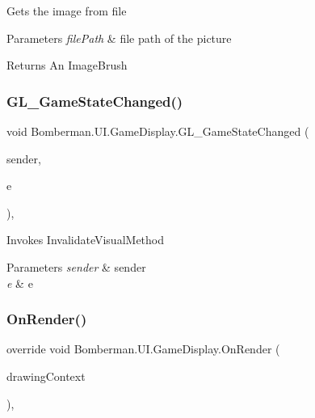 Gets the image from file 


\begin{DoxyParams}{Parameters}
{\em file\+Path} & file path of the picture\\
\hline
\end{DoxyParams}
\begin{DoxyReturn}{Returns}
An Image\+Brush
\end{DoxyReturn}
\mbox{\label{class_bomberman_1_1_u_i_1_1_game_display_a6531b08c32679bdb8721eab5c9ecebcd}} 
\subsubsection{\texorpdfstring{GL\_GameStateChanged()}{GL\_GameStateChanged()}}
{\footnotesize\ttfamily void Bomberman.\+U\+I.\+Game\+Display.\+G\+L\+\_\+\+Game\+State\+Changed (\begin{DoxyParamCaption}\item[{object}]{sender,  }\item[{Event\+Args}]{e }\end{DoxyParamCaption})\hspace{0.3cm}{\ttfamily [inline]}, {\ttfamily [private]}}



Invokes Invalidate\+Visual\+Method 


\begin{DoxyParams}{Parameters}
{\em sender} & sender \\
\hline
{\em e} & e \\
\hline
\end{DoxyParams}
\mbox{\label{class_bomberman_1_1_u_i_1_1_game_display_aece76d3ef75b0e12e43a281856e11a8e}} 
\subsubsection{\texorpdfstring{OnRender()}{OnRender()}}
{\footnotesize\ttfamily override void Bomberman.\+U\+I.\+Game\+Display.\+On\+Render (\begin{DoxyParamCaption}\item[{Drawing\+Context}]{drawing\+Context }\end{DoxyParamCaption})\hspace{0.3cm}{\ttfamily [inline]}, {\ttfamily [protected]}}



